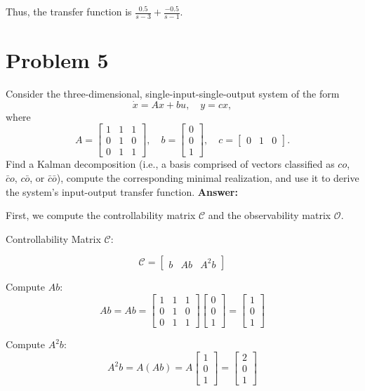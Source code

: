 \documentclass[12pt]{article}
\begin{document}
Thus, the transfer function is \(\frac{0.5}{s-3}+\frac{-0.5}{s-1}\).

\section*{Problem 5}
Consider the three-dimensional, single-input-single-output system of the form
\[
\dot{x} = Ax + bu, \quad y = cx,
\]
where
\[
A = \begin{bmatrix}
1 & 1 & 1 \\
0 & 1 & 0 \\
0 & 1 & 1
\end{bmatrix}, \quad
b = \begin{bmatrix}
0 \\ 0 \\ 1
\end{bmatrix}, \quad
c = \begin{bmatrix}
0 & 1 & 0
\end{bmatrix}.
\]
Find a Kalman decomposition (i.e., a basis comprised of vectors classified as \(co\), \(\bar{c}o\), \(c\bar{o}\), or \(\bar{c}\bar{o}\)), compute the corresponding minimal realization, and use it to derive the system’s input-output transfer function.
\textbf{Answer:}

First, we compute the controllability matrix $\mathcal{C}$ and the observability matrix $\mathcal{O}$.

Controllability Matrix $\mathcal{C}$:

\[
\mathcal{C} = \begin{bmatrix} b & Ab & A^2b \end{bmatrix}
\]

Compute $Ab$:
\[
Ab = A b = \begin{bmatrix}
1 & 1 & 1 \\
0 & 1 & 0 \\
0 & 1 & 1
\end{bmatrix} \begin{bmatrix} 0 \\ 0 \\ 1 \end{bmatrix} = \begin{bmatrix} 1 \\ 0 \\ 1 \end{bmatrix}
\]

Compute $A^2b$:
\[
A^2b = A(Ab) = A \begin{bmatrix} 1 \\ 0 \\ 1 \end{bmatrix} = \begin{bmatrix} 2 \\ 0 \\ 1 \end{bmatrix}
\]
\end{document}
